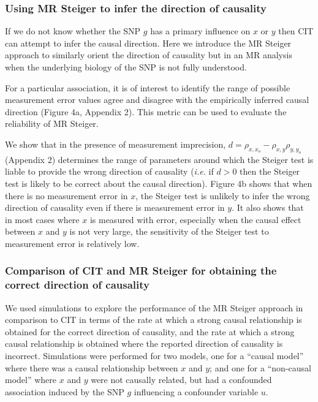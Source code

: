 \documentclass[]{article}
\begin{document}
\subsubsection{Using MR Steiger to infer the direction of
causality}\label{using-mr-steiger-to-infer-the-direction-of-causality}

If we do not know whether the SNP \(g\) has a primary influence on \(x\)
or \(y\) then CIT can attempt to infer the causal direction. Here we
introduce the MR Steiger approach to similarly orient the direction of
causality but in an MR analysis when the underlying biology of the SNP
is not fully understood.

For a particular association, it is of interest to identify the range of
possible measurement error values agree and disagree with the
empirically inferred causal direction (Figure 4a, Appendix 2). This
metric can be used to evaluate the reliability of MR Steiger.

We show that in the presence of measurement imprecision,
\(d = \rho_{x, x_o} - \rho_{x,y}\rho_{y,y_o}\) (Appendix 2) determines
the range of parameters around which the Steiger test is liable to
provide the wrong direction of causality (\emph{i.e.} if \(d>0\) then
the Steiger test is likely to be correct about the causal direction).
Figure 4b shows that when there is no measurement error in \(x\), the
Steiger test is unlikely to infer the wrong direction of causality even
if there is measurement error in \(y\). It also shows that in most cases
where \(x\) is measured with error, especially when the causal effect
between \(x\) and \(y\) is not very large, the sensitivity of the
Steiger test to measurement error is relatively low.

\subsubsection{Comparison of CIT and MR Steiger for obtaining the
correct direction of
causality}\label{comparison-of-cit-and-mr-steiger-for-obtaining-the-correct-direction-of-causality}

We used simulations to explore the performance of the MR Steiger
approach in comparison to CIT in terms of the rate at which a strong
causal relationship is obtained for the correct direction of causality,
and the rate at which a strong causal relationship is obtained where the
reported direction of causality is incorrect. Simulations were performed
for two models, one for a ``causal model'' where there was a causal
relationship between \(x\) and \(y\); and one for a ``non-causal model''
where \(x\) and \(y\) were not causally related, but had a confounded
association induced by the SNP \(g\) influencing a confounder variable
\(u\).
\end{document}
